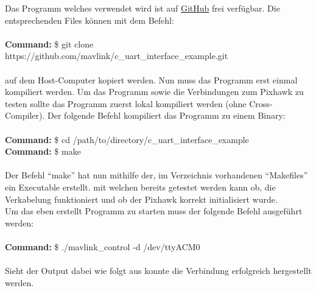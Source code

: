\documentclass[12pt]{article} %
\begin{document}
	Das Programm welches verwendet wird ist auf \href{https://github.com/mavlink/c_uart_interface_example}{GitHub} frei verfügbar. Die entsprechenden Files können mit dem Befehl:
	\\ \\
	\noindent\hspace*{15mm} \textbf{Command:} \$ git clone https://github.com/mavlink/c\_uart\_interface\_example.git\\ \\
	\noindent
	auf dem Host-Computer kopiert werden. Nun muss das Programm erst einmal kompiliert werden. Um das Programm sowie die Verbindungen zum Pixhawk zu testen sollte das Programm zuerst lokal kompiliert werden (ohne Cross-Compiler). Der folgende Befehl kompiliert das Programm zu einem Binary:
	\\ \\
	\noindent\hspace*{30mm} \textbf{Command:} \$ cd /path/to/directory/c\_uart\_interface\_example\\
	\noindent\hspace*{30mm} \textbf{Command:} \$ make\\
	\\
	Der Befehl "`make"' hat nun mithilfe der, im Verzeichnis vorhandenen "`Makefiles"' ein Executable erstellt. mit welchen bereits getestet werden kann ob, die Verkabelung funktioniert und ob der Pixhawk korrekt initialisiert wurde.\\
	Um das eben erstellt Programm zu starten muss der folgende Befehl ausgeführt werden:
	\\ \\
	\noindent\hspace*{30mm} \textbf{Command:} \$ ./mavlink\_control -d /dev/ttyACM0\\ \label{Exec Mav}
	\\
	Sieht der Output dabei wie folgt aus konnte die Verbindung erfolgreich hergestellt werden.
\end{document}
